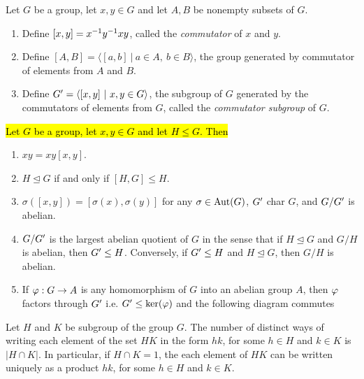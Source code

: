 \nl

\begin{defn}
Let $G$ be a group, let $x,y\in G$ and let $A,B$ be nonempty subsets of $G$.
\begin{enumerate}
\item Define $[x,y] = x^{-1} y^{-1} xy$, called the \textit{commutator} of $x$ and $y$.
\item Define $[A,B] = \langle [a,b]\ |\ a\in A,\ b\in B\rangle$, the group generated by commutator of elements from $A$ and $B$.
\item Define $G^\prime = \langle [x,y]\ |\ x,y\in G\rangle$, the subgroup of $G$ generated by the commutators of elements from $G$, called the \textit{commutator subgroup} of $G$.
\end{enumerate}
\end{defn}

\nl

\begin{prop}
\hl{Let $G$ be a group, let $x,y\in G$ and let $H\leq G$. Then}
\begin{enumerate}
\item $xy = xy[x,y]$.
\item $H\unlhd G$ if and only if $[H,G]\leq H$.
\item $\sigma([x,y]) = [\sigma(x), \sigma(y)]$ for any $\sigma \in \text{Aut}(G)$, $G^\prime$ char $G$, and $G/G^\prime$ is abelian.
\item $G/G^\prime$ is the largest abelian quotient of $G$ in the sense that if $H\unlhd G$ and $G/H$ is abelian, then $G^\prime\leq H$. Conversely, if $G^\prime\leq H$ and $H\unlhd G$, then $G/H$ is abelian.
\item If $\varphi:G\rightarrow A$ is any homomorphism of $G$ into an abelian group $A$, then $\varphi$ factors through $G^\prime$ i.e. $G^\prime\leq\ker(\varphi)$ and the following diagram commutes
\end{enumerate}
\begin{center}
\end{center}
\end{prop}

\nl

\begin{prop}
Let $H$ and $K$ be subgroup of the group $G$. The number of distinct ways of writing each element of the set $HK$ in the form $hk$, for some $h\in H$ and $k\in K$ is $|H\cap K|$. In particular, if $H\cap K = 1$, the each element of $HK$ can be written uniquely as a product $hk$, for some $h\in H$ and $k\in K$.
\end{prop}

